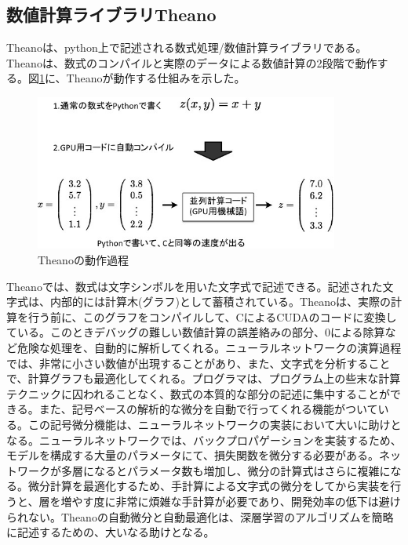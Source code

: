 \subsection{数値計算ライブラリTheano}
Theanoは、python上で記述される数式処理/数値計算ライブラリである。Theanoは、数式のコンパイルと実際のデータによる数値計算の2段階で動作する\cite{bergstra+al:2010-Scipy}。図\ref{c4_Theano_compile}に、Theanoが動作する仕組みを示した。
\begin{figure}[tbp]
 \centering
  \includegraphics[width=100mm]{img/c4/theano_compile}
 \caption{Theanoの動作過程}
 \label{c4_Theano_compile}
\end{figure}
Theanoでは、数式は文字シンボルを用いた文字式で記述できる。記述された文字式は、内部的には計算木(グラフ)として蓄積されている。Theanoは、実際の計算を行う前に、このグラフをコンパイルして、CによるCUDAのコードに変換している。このときデバッグの難しい数値計算の誤差絡みの部分、0による除算など危険な処理を、自動的に解析してくれる。ニューラルネットワークの演算過程では、非常に小さい数値が出現することがあり、また、文字式を分析することで、計算グラフも最適化してくれる。プログラマは、プログラム上の些末な計算テクニックに囚われることなく、数式の本質的な部分の記述に集中することができる。また、記号ベースの解析的な微分を自動で行ってくれる機能がついている。この記号微分機能は、ニューラルネットワークの実装において大いに助けとなる。ニューラルネットワークでは、バックプロパゲーションを実装するため、モデルを構成する大量のパラメータにて、損失関数を微分する必要がある。ネットワークが多層になるとパラメータ数も増加し、微分の計算式はさらに複雑になる。微分計算を最適化するため、手計算による文字式の微分をしてから実装を行うと、層を増やす度に非常に煩雑な手計算が必要であり、開発効率の低下は避けられない。Theanoの自動微分と自動最適化は、深層学習のアルゴリズムを簡略に記述するための、大いなる助けとなる。

